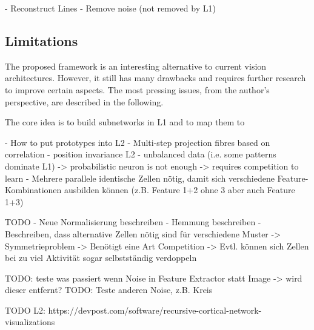 - Reconstruct Lines
- Remove noise (not removed by L1)



\subsection{Limitations}
The proposed framework is an interesting alternative to current vision architectures.
However, it still has many drawbacks and requires further research to improve certain aspects.
The most pressing issues, from the author's perspective, are described in the following.

The core idea is to build subnetworks in L1 and to map them to 


- How to put prototypes into L2
- Multi-step projection fibres based on correlation
- position invariance L2
- unbalanced data (i.e. some patterns dominate L1) -> probabilistic neuron is not enough -> requires competition to learn
- Mehrere parallele identische Zellen nötig, damit sich verschiedene Feature-Kombinationen ausbilden können (z.B. Feature 1+2 ohne 3 aber auch Feature 1+3)


TODO
- Neue Normalisierung beschreiben
- Hemmung beschreiben
- Beschreiben, dass alternative Zellen nötig sind für verschiedene Muster -> Symmetrieproblem -> Benötigt eine Art Competition -> Evtl. können sich Zellen bei zu viel Aktivität sogar selbstständig verdoppeln




TODO: teste was passiert wenn Noise in Feature Extractor statt Image -> wird dieser entfernt?
TODO: Teste anderen Noise, z.B. Kreis


TODO L2: https://devpost.com/software/recursive-cortical-network-visualizations